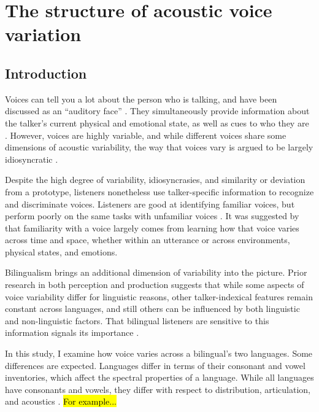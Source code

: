 \setcounter{chapter}{2}
\chapter{The structure of acoustic voice variation}
\label{ch3:Voice}


\section{Introduction}\label{ch3:sec:introduction}
Voices can tell you a lot about the person who is talking, and have been discussed as an ``auditory face'' \citep{belin_2004_voice}. They simultaneously provide information about the talker's current physical and emotional state, as well as cues to who they are \citep{belin_2004_voice}. However, voices are highly variable, and while different voices share some dimensions of acoustic variability, the way that voices vary is argued to be largely idiosyncratic \citep{lee_2019_acoustic-paper}. %

Despite the high degree of variability, idiosyncrasies, and similarity or deviation from a prototype, listeners nonetheless use talker-specific information to recognize and discriminate voices. Listeners are good at identifying familiar voices, but perform poorly on the same tasks with unfamiliar voices \citep{nygaard_1998_talker}. It was suggested by \citet{lee_2019_acoustic-paper} that familiarity with a voice largely comes from learning how that voice varies across time and space, whether within an utterance or across environments, physical states, and emotions.

Bilingualism brings an additional dimension of variability into the picture. Prior research in both perception and production suggests that while some aspects of voice variability differ for linguistic reasons, other talker-indexical features remain constant across languages, and still others can be influenced by both linguistic and non-linguistic factors. That bilingual listeners are sensitive to this information signals its importance \citep{orena_2019_identifying,fricke_2016_phonetic}.

In this study, I examine how voice varies across a bilingual's two languages. Some differences are expected. Languages differ in terms of their consonant and vowel inventories, which affect the spectral properties of a language. While all languages have consonants and vowels, they differ with respect to distribution, articulation, and acoustics . \hl{For example...}

